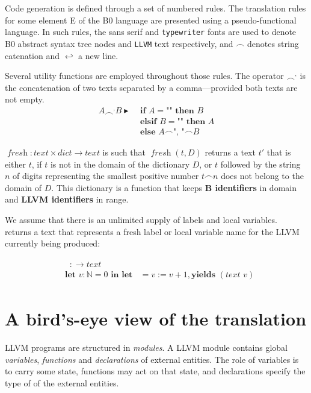 \documentclass{article}
\newcommand{\nl}[0]{\ensuremath{\hookleftarrow}}
\DeclareMathOperator{\conc}{\smallfrown}
\DeclareMathOperator{\isdef}{\blacktriangleright}
\DeclareMathOperator{\fresh}{\textit{fresh}}
\DeclareMathOperator{\name}{\mathcal{L}()}
\begin{document}
Code generation is defined through a set of numbered rules. The
translation rules for some element \textsf{E} of the B0 language are
presented using a pseudo-functional language.  In such rules, the
\textsf{sans serif} and \texttt{typewriter} fonts are used to denote
\textsf{B0} abstract syntax tree nodes and \texttt{LLVM} text
respectively, and $\conc$ denotes string catenation and $\nl$ a new
line.

Several utility functions are employed throughout those rules.  The
operator $\conc^,$ is the concatenation of two texts separated by a
comma---provided both texts are not empty.
\begin{align}
A \conc^, B \isdef & \textbf{ if } A = \texttt{""} \textbf{ then } B \nonumber \\
& \textbf{ elsif } B = \texttt{""} \textbf{ then } A \nonumber \\
& \textbf{ else } A \conc \texttt{", "} \conc B \nonumber
\end{align}

$\fresh: text \times dict \rightarrow text$ is such that
$\fresh(t, D)$  returns a text $t'$ that is either $t$, if $t$ is not in
the domain of the dictionary $D$, or $t$ followed by the string $n$ of
digits representing the smallest positive number $t \conc n$ does not
belong to the domain of $D$. This dictionary is a function that keeps 
\textbf{B identifiers} in domain and \textbf{LLVM identifiers} in range.

We assume that there is an unlimited supply of labels and local variables.
$\name$ returns a text that represents a fresh label or local variable
name for the LLVM currently being produced:
\begin{framed}
\begin{align}
\begin{split}
  &\name : \rightarrow text \\
  &\textbf{let } v : \mathbb{N} = 0 \textbf{ in let } \name = v := v + 1, \textbf{yields } (\textit{text } v)
\end{split}
\end{align}
\end{framed}

\section{A bird's-eye view of the translation}
\label{sec:view}

LLVM programs are structured in \emph{modules}. A LLVM module contains
global \emph{variables}, \emph{functions} and \emph{declarations} of
external entities. The role of variables is to carry some state,
functions may act on that state, and declarations specify the type of
of the external entities.
\end{document}
